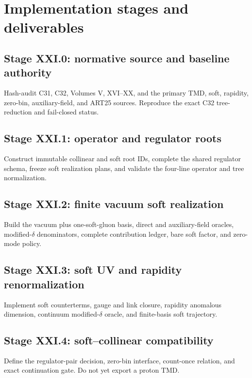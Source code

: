 \documentclass[11pt]{article}
\newcommand{\TMD}{\ensuremath{\mathrm{TMD}}}
\begin{document}
\section{Implementation stages and deliverables}
\label{sec:stages}

\subsection{Stage XXI.0: normative source and baseline authority}

Hash-audit C31, C32, Volumes V, XVI--XX, and the primary TMD, soft, rapidity, zero-bin, auxiliary-field, and ART25 sources.  Reproduce the exact C32 tree-reduction and fail-closed status.

\subsection{Stage XXI.1: operator and regulator roots}

Construct immutable collinear and soft root IDs, complete the shared regulator schema, freeze soft realization plans, and validate the four-line operator and tree normalization.

\subsection{Stage XXI.2: finite vacuum soft realization}

Build the vacuum plus one-soft-gluon basis, direct and auxiliary-field oracles, modified-\(\delta\) denominators, complete contribution ledger, bare soft factor, and zero-mode policy.

\subsection{Stage XXI.3: soft UV and rapidity renormalization}

Implement soft counterterms, gauge and link closure, rapidity anomalous dimension, continuum modified-\(\delta\) oracle, and finite-basis soft trajectory.

\subsection{Stage XXI.4: soft--collinear compatibility}

Define the regulator-pair decision, zero-bin interface, count-once relation, and exact continuation gate.  Do not yet export a proton \TMD.
\end{document}

